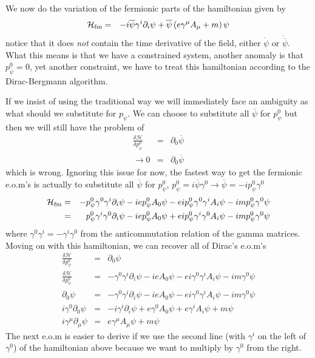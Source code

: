 \documentclass[aps,preprint,preprintnumbers,nofootinbib,showpacs,prd]{revtex4-1}
\newcommand{\nbea}{\begin{eqnarray*}}
\newcommand{\neea}{\end{eqnarray*}}
\begin{document}
We now do the variation of the fermionic parts of the hamiltonian given by  
%
\nbea
\mathcal{H}_{\rm fm} & = & - i \overline \psi \gamma^i \partial_i \psi + \overline \psi \left ( e \gamma^\mu A_\mu + m\right ) \psi 
\neea
%
notice that it does {\it not} contain the time derivative of the field, either $\dot \psi$ or $\dot {\overline \psi}$. What this means is that we have a constrained system, another anomaly is that $p^0_{\overline \psi} = 0$, yet another constraint, we have to treat this hamiltonian according to the Dirac-Bergmann algorithm.

If we insist of using the traditional way we will immediately face an ambiguity as what should we substitute for $p_\psi$. We can choose to substitute all $\overline \psi$ for $p^0_\psi$ but then we will still have the problem of 
%
\nbea
\frac{\delta \mathcal{H}}{\delta p^0_{\overline \psi}} & = & \partial_0 \overline \psi \\
\rightarrow 0 & = & \partial_0 \overline \psi
\neea
%
which is wrong. Ignoring this issue for now, the fastest way to get the fermionic e.o.m's is actually to substitute all $\overline \psi$ for $p^0_\psi$, $p^0_{\psi} = i \overline \psi \gamma^0 \to \overline\psi = -i p^0_{\psi} \gamma^0$
%
\nbea
\mathcal{H}_{\rm fm} & = & - p^0_{\psi} \gamma^0 \gamma^i \partial_i \psi -i e p^0_\psi A_0 \psi  - e i p^0_{\psi} \gamma^0 \gamma^i A_i \psi - i m p^0_{\psi} \gamma^0 \psi \\
 & = & p^0_{\psi} \gamma^i \gamma^0 \partial_i \psi - i e p^0_\psi A_0 \psi  + e i p^0_{\psi}  \gamma^i \gamma^0 A_i \psi - i m p^0_{\psi} \gamma^0 \psi
\neea
%
where $\gamma^0\gamma^i = -\gamma^i\gamma^0$ from the anticommutation relation of the gamma matrices. Moving on with this hamiltonian, we can recover all of Dirac's e.o.m's
%
\nbea
\frac{\delta \mathcal{H}}{\delta p^0_\psi} & = & \partial_0 \psi \\
\frac{\delta \mathcal{H}}{\delta p^0_\psi} & = &  - \gamma^0 \gamma^i \partial_i \psi -i e A_0 \psi  - e i \gamma^0 \gamma^i A_i \psi - i m \gamma^0 \psi \\
\partial_0 \psi  & = &  - \gamma^0 \gamma^i \partial_i \psi -i e A_0 \psi  - e i \gamma^0 \gamma^i A_i \psi - i m \gamma^0 \psi \\
i \gamma^0 \partial_0 \psi  & = &  - i \gamma^i \partial_i \psi + e \gamma^0 A_0 \psi  + e \gamma^i A_i \psi + m \psi \\
i \gamma^\mu \partial_\mu \psi  & = &  e \gamma^\mu A_\mu \psi + m \psi
\neea
%
The next e.o.m is easier to derive if we use the second line (with $\gamma^i$ on the left of $\gamma^0$) of the hamiltonian above because we want to multiply by $\gamma^0$ from the right.
\end{document}
